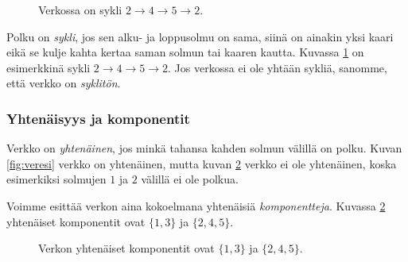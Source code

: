\begin{figure}
\center
\begin{center}
\end{center}
\caption{Verkossa on sykli $2 \rightarrow 4 \rightarrow 5 \rightarrow 2$.}
\label{fig:versyk}
\end{figure}

Polku on \emph{sykli}, jos sen alku- ja loppusolmu on sama,
siinä on ainakin yksi kaari 
eikä se kulje kahta kertaa saman solmun tai kaaren kautta.
Kuvassa \ref{fig:versyk} on esimerkkinä sykli
$2 \rightarrow 4 \rightarrow 5 \rightarrow 2$.
Jos verkossa ei ole yhtään sykliä, sanomme, että verkko on \emph{syklitön}.

\subsubsection{Yhtenäisyys ja komponentit}

Verkko on \emph{yhtenäinen},
jos minkä tahansa kahden solmun välillä on polku.
Kuvan \ref{fig:veresi} verkko on yhtenäinen,
mutta kuvan \ref{fig:veryht} verkko ei ole yhtenäinen,
koska esimerkiksi solmujen $1$ ja $2$ välillä ei ole polkua.

Voimme esittää verkon aina kokoelmana yhtenäisiä \emph{komponentteja}.
Kuvassa \ref{fig:veryht} yhtenäiset komponentit
ovat $\{1,3\}$ ja $\{2,4,5\}$.

\begin{figure}
\center
\begin{center}
\end{center}
\caption{Verkon yhtenäiset komponentit ovat $\{1,3\}$ ja $\{2,4,5\}$.}
\label{fig:veryht}
\end{figure}

